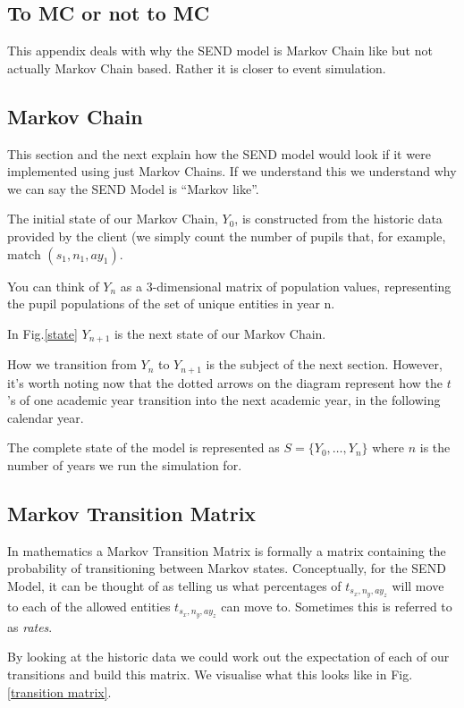 \documentclass[margin=5mm]{article}
\begin{document}
\begin{appendices}
\section{To MC or not to MC}
This appendix deals with why the SEND model is Markov Chain like but
not actually Markov Chain based.  Rather it is closer to event
simulation.

\subsection{Markov Chain}

This section and the next explain how the SEND model would look if it
were implemented using just Markov Chains.  If we understand this we
understand why we can say the SEND Model is ``Markov like''.

The initial state of our Markov Chain, $Y_0$, is constructed from the
historic data provided by the client (we simply count the number of
pupils that, for example, match $(s_1,n_1,ay_1)$.

You can think of $Y_n$ as a 3-dimensional matrix of population values,
representing the pupil populations of the set of unique entities in
year n.

In Fig.\ref{state} $Y_{n+1}$ is the next state of our Markov Chain.

How we transition from $Y_{n}$ to $Y_{n+1}$ is the subject of the next
section.  However, it's worth noting now that the dotted arrows on the
diagram represent how the $t$'s of one academic year transition into
the next academic year, in the following calendar year.

The complete state of the model is represented as $S = \{Y_0, \dots,
Y_n\}$ where $n$ is the number of years we run the simulation for.

\subsection{Markov Transition Matrix}

In mathematics a Markov Transition Matrix is formally a matrix
containing the probability of transitioning between Markov states.
Conceptually, for the SEND Model, it can be thought of as telling us
what percentages of $t_{s_x,n_y,ay_z}$ will move to each of the
allowed entities $t_{s_x,n_y,ay_z}$ can move to.  Sometimes this is
referred to as \textit{rates}.

By looking at the historic data we could work out the expectation of
each of our transitions and build this matrix.  We visualise what this
looks like in Fig.\ref{transition matrix}.
\begin{figure}[h!]
  \begin{tikzpicture}[every node/.style={anchor=north east,fill=white,minimum width=1.4cm,minimum height=7mm}]


\end{tikzpicture}
\end{figure}
\end{appendices}
\end{document}
